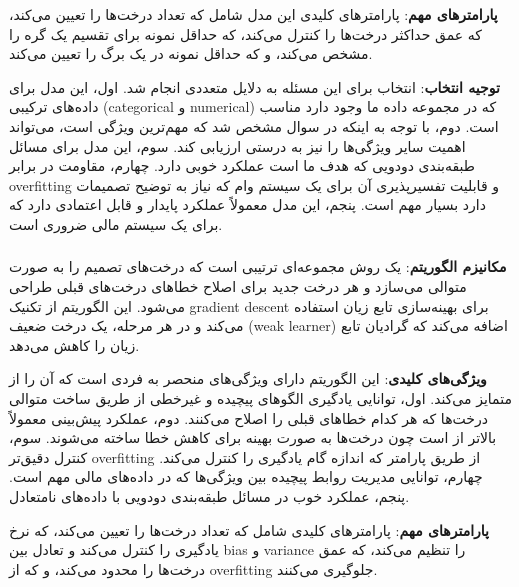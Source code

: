 \documentclass{article}
\begin{document}
\textbf{پارامترهای مهم}: پارامترهای کلیدی این مدل شامل  که تعداد درخت‌ها را تعیین می‌کند،  که عمق حداکثر درخت‌ها را کنترل می‌کند،  که حداقل نمونه برای تقسیم یک گره را مشخص می‌کند، و  که حداقل نمونه در یک برگ را تعیین می‌کند.

\textbf{توجیه انتخاب}: انتخاب  برای این مسئله به دلایل متعددی انجام شد. اول، این مدل برای داده‌های ترکیبی (categorical و numerical) که در مجموعه داده ما وجود دارد مناسب است. دوم، با توجه به اینکه در سوال  مشخص شد که  مهم‌ترین ویژگی است،  می‌تواند اهمیت سایر ویژگی‌ها را نیز به درستی ارزیابی کند. سوم، این مدل برای مسائل طبقه‌بندی دودویی که هدف ما است عملکرد خوبی دارد. چهارم، مقاومت در برابر overfitting و قابلیت تفسیرپذیری آن برای یک سیستم وام که نیاز به توضیح تصمیمات دارد بسیار مهم است. پنجم، این مدل معمولاً عملکرد پایدار و قابل اعتمادی دارد که برای یک سیستم مالی ضروری است.

\subsubsection{}

\textbf{مکانیزم الگوریتم}:  یک روش مجموعه‌ای ترتیبی است که درخت‌های تصمیم را به صورت متوالی می‌سازد و هر درخت جدید برای اصلاح خطاهای درخت‌های قبلی طراحی می‌شود. این الگوریتم از تکنیک gradient descent برای بهینه‌سازی تابع زیان استفاده می‌کند و در هر مرحله، یک درخت ضعیف (weak learner) اضافه می‌کند که گرادیان تابع زیان را کاهش می‌دهد.

\textbf{ویژگی‌های کلیدی}: این الگوریتم دارای ویژگی‌های منحصر به فردی است که آن را از  متمایز می‌کند. اول، توانایی یادگیری الگوهای پیچیده و غیرخطی از طریق ساخت متوالی درخت‌ها که هر کدام خطاهای قبلی را اصلاح می‌کنند. دوم، عملکرد پیش‌بینی معمولاً بالاتر از  است چون درخت‌ها به صورت بهینه برای کاهش خطا ساخته می‌شوند. سوم، کنترل دقیق‌تر overfitting از طریق پارامتر  که اندازه گام یادگیری را کنترل می‌کند. چهارم، توانایی مدیریت روابط پیچیده بین ویژگی‌ها که در داده‌های مالی مهم است. پنجم، عملکرد خوب در مسائل طبقه‌بندی دودویی با داده‌های نامتعادل.

\textbf{پارامترهای مهم}: پارامترهای کلیدی شامل  که تعداد درخت‌ها را تعیین می‌کند،  که نرخ یادگیری را کنترل می‌کند و تعادل بین bias و variance را تنظیم می‌کند،  که عمق درخت‌ها را محدود می‌کند،  و  که از overfitting جلوگیری می‌کنند.
\end{document}

